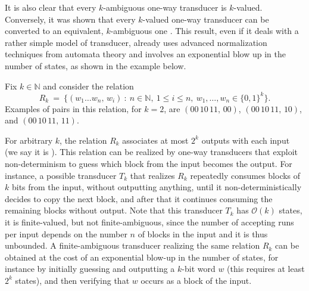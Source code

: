 \documentclass{article}
\providecommand{\AP}{}\NewDocumentCommand{\reintro}{o m}{#2}
\begin{document}
It is also clear that every $k$-ambiguous
one-way transducer is $k$-valued. 
Conversely, it was shown that every $k$-valued
one-way transducer can be converted to an 
equivalent, $k$-ambiguous one 
\cite{Weber93,web96,DBLP:journals/mst/SakarovitchS10}.
This result, even if it deals with a rather simple model
of transducer, already uses advanced normalization techniques 
from automata theory and involves an exponential
blow up in the number of states, as shown in the 
example below.

\begin{example}\label{ex:finitevalued}
    Fix $k\in\mathbb{N}$ and consider the relation
    \[
      R_k ~=~ 
      \big\{ 
        (w_1\dots w_n, \, w_i) \::\:
        n\in\mathbb{N}, \: 1\leq i\leq n, \:
        w_1,\dots,w_n \in \{0,1\}^k
      \big\}.
    \]
    Examples of pairs in this relation, for $k=2$, are 
    $(00\,10\,11,\,00)$, 
    $(00\,10\,11,\,10)$, and 
    $(00\,10\,11,\,11)$. 
    \AP
    For arbitrary $k$, the relation $R_k$ 
    associates at most $2^k$ outputs with each input
    (we say it is ).
    This relation can be realized by one-way transducers
    that exploit non-determinism to guess which block from
    the input becomes the output. 
    For instance, a possible transducer $T_k$ that realizes $R_k$
    repeatedly consumes blocks of $k$ bits from the input, 
    without outputting anything, until it non-deterministically 
    decides to copy the next block, and after that it 
    continues consuming the remaining blocks without output.
    Note that this transducer $T_k$ has $\mathcal{O}(k)$
    states, it is finite-valued, but not finite-ambiguous,
    since the number of accepting runs per input 
    depends on the number $n$ of blocks in the input and it 
    is thus unbounded. 
    A finite-ambiguous transducer realizing the same relation
    $R_k$ can be obtained at the cost of an exponential blow-up
    in the number of states, 
    for instance by initially guessing and outputting a $k$-bit
    word $w$ (this requires at least $2^k$ states), 
    and then verifying that $w$ occurs 
    as a block of the input. 
\end{example}
\end{document}
